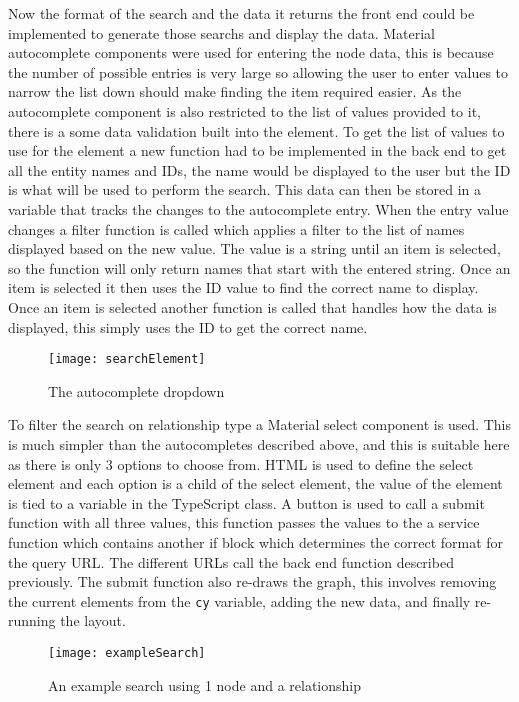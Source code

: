 Now the format of the search and the data it returns the front end could be implemented to generate those searchs and display the data.
Material autocomplete components were used for entering the node data, this is because the number of possible entries is very large so allowing the 
user to enter values to narrow the list down should make finding the item required easier. As the autocomplete component is also restricted to the list 
of values provided to it, there is a some data validation built into the element. To get the list of values to use for the element a new function had to be 
implemented in the back end to get all the entity names and IDs, the name would be displayed to the user but the ID is what will be used to perform the search.
This data can then be stored in a variable that tracks the changes to the autocomplete entry. When the entry value changes a filter function is called which applies 
a filter to the list of names displayed based on the new value. The value is a string until an item is selected, so the function will only return names that start with the entered string. 
Once an item is selected it then uses the ID value to find the correct name to display. Once an item is selected another function is called that handles how the data is displayed,
this simply uses the ID to get the correct name.
\begin{figure}[H]
    \centering
    \texttt{[image: searchElement]}
    \caption{The autocomplete dropdown}
\end{figure}
To filter the search on relationship type a Material select component is used. This is much simpler than the autocompletes described above, and this is 
suitable here as there is only 3 options to choose from. HTML is used to define the select element and each option is a child of the select element, 
the value of the element is tied to a variable in the TypeScript class.
A button is used to call a submit function with all three values, this function passes the values to the a service function which contains another if block 
which determines the correct format for the query URL. The different URLs call the back end function described previously.
The submit function also re-draws the graph, this involves removing the current elements from the \verb|cy| variable, adding the new data, and finally re-running 
the layout.
\begin{figure}[H]
    \centering
    \texttt{[image: exampleSearch]}
    \caption{An example search using 1 node and a relationship}
\end{figure}